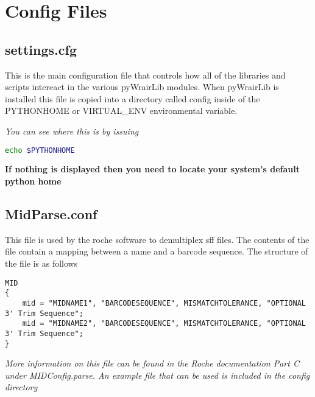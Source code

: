 \documentclass{article}
\begin{document}
\section{Config Files}

\subsection{settings.cfg}
This is the main configuration file that controls how all of the libraries and scripts intereact in the various pyWrairLib modules. When pyWrairLib is installed this file is copied into a directory called config inside of the PYTHONHOME or VIRTUAL\_ENV environmental variable.

\textit{You can see where this is by issuing}

\begin{lstlisting}[language=bash]
echo $PYTHONHOME
\end{lstlisting}

\textbf{If nothing is displayed then you need to locate your system's default python home}

\subsection{MidParse.conf}
This file is used by the roche software to demultiplex sff files. The contents of the file contain a mapping
between a name and a barcode sequence.
The structure of the file is as follows
\begin{lstlisting}
MID
{
    mid = "MIDNAME1", "BARCODESEQUENCE", MISMATCHTOLERANCE, "OPTIONAL 3' Trim Sequence";
    mid = "MIDNAME2", "BARCODESEQUENCE", MISMATCHTOLERANCE, "OPTIONAL 3' Trim Sequence";
}
\end{lstlisting}

{\em More information on this file can be found in the Roche documentation Part C under MIDConfig.parse. An example file that can be used is included in the config directory}
\end{document}

